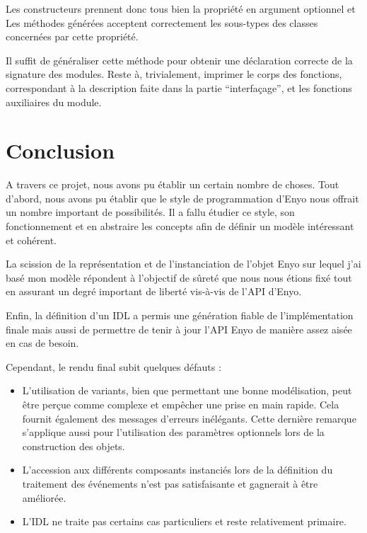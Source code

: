 \documentclass[11pt,a4paper]{report}
\begin{document}
Les constructeurs prennent donc tous bien la propriété en argument optionnel et
Les méthodes générées acceptent correctement les sous-types des classes concernées par cette propriété.

Il suffit de généraliser cette méthode pour obtenir une déclaration correcte de la signature des modules.
Reste à, trivialement, imprimer le corps des fonctions, correspondant à la description faite dans la partie ``interfaçage'',
et les fonctions auxiliaires du module.



\chapter{Conclusion}

A travers ce projet, nous avons pu établir un certain nombre de choses.
Tout d'abord, nous avons pu établir que le style de programmation d'Enyo nous offrait
un nombre important de possibilités. Il a fallu étudier ce style, son fonctionnement et 
en abstraire les concepts afin de définir un modèle intéressant et cohérent.

La scission de la représentation et de l'instanciation de l'objet Enyo sur lequel j'ai basé mon modèle
répondent à l'objectif de sûreté que nous nous étions fixé tout en assurant un degré important
de liberté vis-à-vis de l'API d'Enyo.

Enfin, la définition d'un IDL a permis une génération fiable de l'implémentation finale mais aussi de 
permettre de tenir à jour l'API Enyo de manière assez aisée en cas de besoin.

Cependant, le rendu final subit quelques défauts : 
\begin{itemize}
\item L'utilisation de variants, bien que permettant 
  une bonne modélisation, peut être perçue comme complexe et empêcher une prise en main rapide. Cela fournit
  également des messages d'erreurs inélégants. 
  Cette dernière remarque s'applique aussi pour l'utilisation des paramètres optionnels lors de la
  construction des objets.
\item L'accession aux différents composants instanciés lors de la définition du traitement 
  des événements n'est pas satisfaisante et gagnerait à être améliorée.
\item L'IDL ne traite pas certains cas particuliers et reste relativement primaire.    
\end{itemize}\medskip
\end{document}

